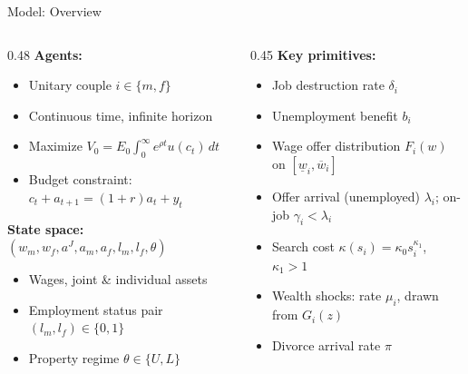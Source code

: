 \documentclass[aspectratio=169, 11pt]{beamer}
\begin{document}
\begin{frame}{Model: Overview}
\begin{columns}
\begin{column}{0.48\textwidth}
\textbf{Agents:}
\small
\begin{itemize}
  \item Unitary couple $i \in \{m, f\}$
  \item Continuous time, infinite horizon
  \item Maximize $V_0 = E_0\int_0^\infty e^{\rho t} u(c_t)\,dt$
  \item Budget constraint: $c_t + a_{t+1} = (1+r)a_t + y_t$
\end{itemize}
\vspace{0.4em}
\normalsize
\textbf{State space:} $(w_m, w_f, a^J, a_m, a_f, l_m, l_f, \theta)$
\small
\begin{itemize}
  \item Wages, joint \& individual assets
  \item Employment status pair $(l_m, l_f) \in \{0,1\}$
  \item Property regime $\theta \in \{U, L\}$
\end{itemize}
\end{column}
\begin{column}{0.45\textwidth}
\small
\textbf{Key primitives:}
\begin{itemize}
  \item Job destruction rate $\delta_i$
  \item Unemployment benefit $b_i$
  \item Wage offer distribution $F_i(w)$ on $[\underline{w}_i, \overline{w}_i]$
  \item Offer arrival (unemployed) $\lambda_i$; on-job $\gamma_i < \lambda_i$
  \item Search cost $\kappa(s_i) = \kappa_0 s_i^{\kappa_1}$, $\kappa_1 > 1$
  \item Wealth shocks: rate $\mu_i$, drawn from $G_i(z)$
  \item Divorce arrival rate $\pi$
\end{itemize}
\end{column}
\end{columns} 
\end{frame}
\end{document}

